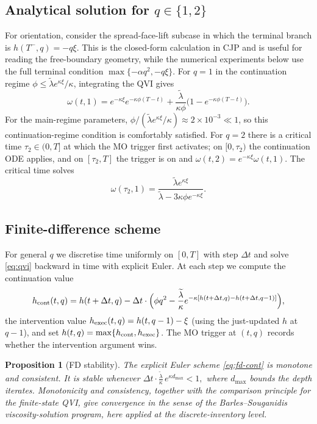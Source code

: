 \documentclass[]{interact}
\theoremstyle{plain}
\newtheorem{proposition}[theorem]{Proposition}
\theoremstyle{definition}
\theoremstyle{remark}
\newcommand{\1}[1]{\mathbf{1}_{\{#1\}}}
\newcommand{\ltil}{\widetilde{\lambda}}
\begin{document}
\subsection{Analytical solution for $q \in \{1,2\}$}\label{sec:q12-analytic}
For orientation, consider the spread-face-lift subcase in which the terminal branch is $h(T^-,q)=-q\xi$. This is the closed-form calculation in CJP and is useful for reading the free-boundary geometry, while the numerical experiments below use the full terminal condition $\max\{-\alpha q^2,-q\xi\}$. For $q = 1$ in the continuation regime $\phi \le \ltil e^{\kappa\xi} / \kappa$, integrating the QVI gives
\begin{equation}\label{eq:omega-q1}
\omega(t,1) = e^{-\kappa\xi} e^{-\kappa\phi(T-t)}
+ \frac{\ltil}{\kappa\phi}\bigl(1 - e^{-\kappa\phi(T-t)}\bigr).
\end{equation}
For the main-regime parameters, $\phi/(\ltil e^{\kappa\xi}/\kappa)\approx 2\times10^{-3}\ll 1$, so this continuation-regime condition is comfortably satisfied.
For $q = 2$ there is a critical time $\tau_2 \in (0, T]$ at which the MO trigger first activates; on $[0, \tau_2)$ the continuation ODE applies, and on $[\tau_2, T]$ the trigger is on and $\omega(t,2) = e^{-\kappa\xi} \omega(t,1)$. The critical time solves
\begin{equation}\label{eq:tau2}
\omega(\tau_2, 1) = \frac{\ltil e^{\kappa\xi}}{\ltil - 3\kappa\phi e^{-\kappa\xi}}.
\end{equation}

\subsection{Finite-difference scheme}\label{sec:fd}
For general $q$ we discretise time uniformly on $[0,T]$ with step $\Delta t$ and solve \eqref{eq:qvi} backward in time with explicit Euler. At each step we compute the continuation value
\begin{equation}\label{eq:fd-cont}
h_{\rm cont}(t,q) = h(t+\Delta t,q) - \Delta t \cdot \Bigl( \phi q^2 - \frac{\ltil}{\kappa} e^{-\kappa[h(t+\Delta t, q) - h(t+\Delta t, q-1)]} \Bigr),
\end{equation}
the intervention value $h_{\rm exec}(t,q) = h(t, q-1) - \xi$ (using the just-updated $h$ at $q-1$), and set $h(t,q) = \max\{h_{\rm cont}, h_{\rm exec}\}$. The MO trigger at $(t,q)$ records whether the intervention argument wins.

\begin{proposition}[FD stability]\label{prop:fd-stability}
The explicit Euler scheme \eqref{eq:fd-cont} is monotone and consistent. It is stable whenever
$
\Delta t \cdot \tfrac{\ltil}{\kappa}\, e^{\kappa d_{\max}} < 1,
$
where $d_{\max}$ bounds the depth iterates. Monotonicity and consistency, together with the comparison principle for the finite-state QVI, give convergence in the sense of the Barles--Souganidis \citep{barlessouganidis1991} viscosity-solution program, here applied at the discrete-inventory level.
\end{proposition}
\end{document}
